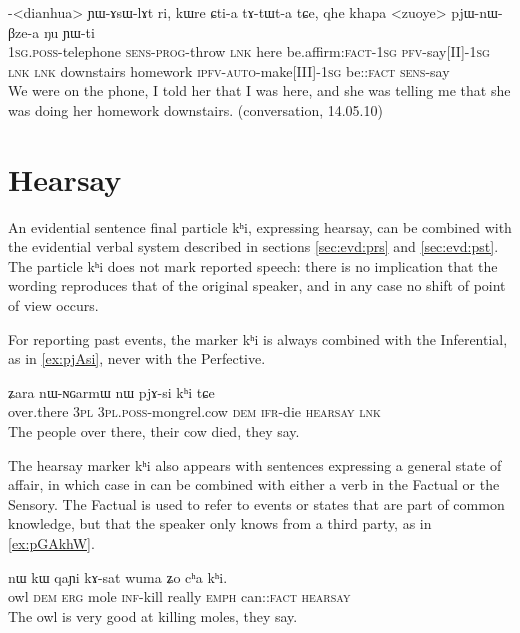 \documentclass[oldfontcommands,oneside,a4paper,11pt]{article}
\newcommand{\ipa}[1]{{\phon \mbox{#1}}} %
\newcommand{\factual}[1]{\textsc{:fact}}
\begin{document}
\begin{exe}
\ex \label{ex:YAsWlAt}
\gll  \ipa{a}-<dianhua> 	\ipa{ɲɯ-ɤsɯ-lɤt} 	\ipa{ri,} 	\ipa{kɯre} 	\ipa{ɕti-a} 	\ipa{tɤ-tɯt-a} 	\ipa{tɕe,} 	\ipa{qhe} 	\ipa{khapa} 	<zuoye> 	\ipa{pjɯ-nɯ-βze-a} 	\ipa{ŋu} 	\ipa{ɲɯ-ti} \\
\textsc{1sg.poss}-telephone \textsc{sens-prog}-throw \textsc{lnk} here be.affirm\factual{}-\textsc{1sg} \textsc{pfv}-say[II]-\textsc{1sg} \textsc{lnk} \textsc{lnk} downstairs homework \textsc{ipfv-auto}-make[III]-\textsc{1sg} be:\factual{} \textsc{sens}-say \\
\glt We were on the phone, I told her that I was here, and she was telling me that she was doing her homework downstairs. (conversation, 14.05.10)
\end{exe}

\section{Hearsay}
An evidential sentence final particle \ipa{kʰi}, expressing hearsay, can be combined with the evidential verbal system described in sections \ref{sec:evd:prs} and \ref{sec:evd:pst}. The particle \ipa{kʰi} does not mark reported speech: there is no implication that the wording reproduces that of the original speaker, and in any case no shift of point of view occurs. 

For reporting past events, the marker \ipa{kʰi} is always combined with the Inferential, as in \ref{ex:pjAsi}, never with the Perfective.

\begin{exe}
\ex \label{ex:pjAsi}
\gll \ipa{tɕɤtu} 	\ipa{ʑara} 	\ipa{nɯ-ɴɢarmɯ} 	\ipa{nɯ} 	\ipa{pjɤ-si} 	\ipa{kʰi} 	\ipa{tɕe} \\
over.there \textsc{3pl} \textsc{3pl.poss}-mongrel.cow  \textsc{dem} \textsc{ifr}-die \textsc{hearsay} \textsc{lnk} \\
\glt The people over there, their cow died, they say.
\end{exe} 
 
 The hearsay marker \ipa{kʰi} also appears with sentences expressing a general state of affair, in which case in can be combined with either a verb in the Factual or the Sensory. The Factual is used to refer to events or states that are part of common knowledge, but that the speaker only knows from a third party, as in \ref{ex:pGAkhW}.
 
 \begin{exe}
\ex \label{ex:pGAkhW}
\gll   \ipa{pɣɤkhɯ}  	\ipa{nɯ}  	\ipa{kɯ}  	\ipa{qaɲi}  	\ipa{kɤ-sat}  	\ipa{wuma}  	\ipa{ʑo}  	\ipa{cʰa} 	\ipa{kʰi.}  \\
owl \textsc{dem} \textsc{erg} mole \textsc{inf}-kill really \textsc{emph} can:\factual{} \textsc{hearsay} \\
\glt The owl is very good at killing moles, they say.
\end{exe} 
  
\end{document}
